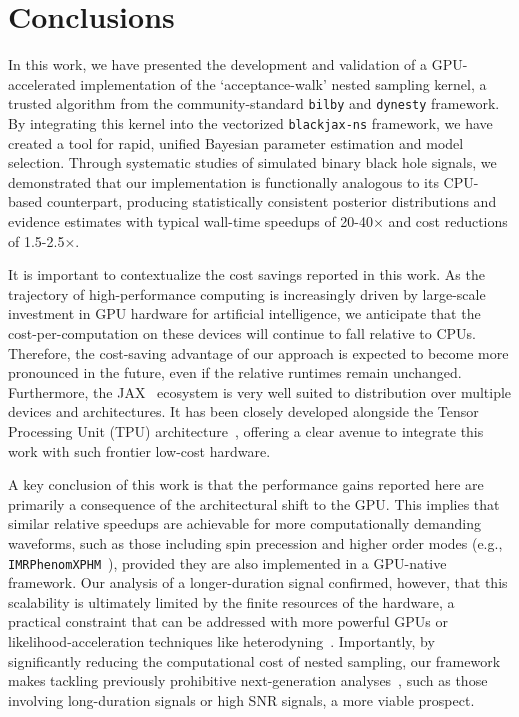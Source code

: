 \documentclass[fleqn,usenatbib]{mnras}
\begin{document}
\section{Conclusions}
\label{sec:conclusions}

In this work, we have presented the development and validation of a
GPU-accelerated implementation of the `acceptance-walk' nested sampling
kernel, a trusted algorithm from the community-standard \texttt{bilby}
and \texttt{dynesty} framework. By integrating this kernel into the
vectorized \texttt{blackjax-ns} framework, we have created a tool for
rapid, unified Bayesian parameter estimation and model selection.
Through systematic studies of simulated binary black hole signals, we
demonstrated that our implementation is functionally analogous to its
CPU-based counterpart, producing statistically consistent posterior
distributions and evidence estimates with typical wall-time speedups of
20-40$\times$ and cost reductions of 1.5-2.5$\times$.

It is important to contextualize the cost savings reported in this
work. As the trajectory of
high-performance computing is increasingly driven by large-scale
investment in GPU hardware for artificial intelligence, we
anticipate that the cost-per-computation on these devices will continue
to fall relative to CPUs. Therefore, the cost-saving advantage of our
approach is expected to become more pronounced in the future, even
if the relative runtimes remain unchanged. 
Furthermore, the JAX~\citep{jax2018github} ecosystem is very well 
suited to distribution over multiple devices and 
architectures. It has been closely developed alongside the 
Tensor Processing Unit (TPU) architecture~\citep{jouppi2023tpu}, 
offering a clear avenue to integrate this work with such 
frontier low-cost hardware.

A key conclusion of this work is that the performance gains 
reported here are primarily a consequence
of the architectural shift to the GPU. This implies that similar relative
speedups are achievable for more computationally demanding waveforms,
such as those including spin precession and higher order modes (e.g., 
\texttt{IMRPhenomXPHM}~\citep{IMRPhenomXPHM}), provided they are also
implemented in a GPU-native framework. Our analysis of a longer-duration
signal confirmed, however, that this scalability is ultimately limited
by the finite resources of the hardware, a practical constraint that can
be addressed with more powerful GPUs or likelihood-acceleration techniques
like heterodyning~\citep{TL_relativebinning,relativebinning2,relativebinning3,relativebinning4}.
Importantly, by significantly reducing the computational cost
of nested sampling, our framework makes tackling previously prohibitive
next-generation analyses~\citep{HuAccelerationReview, makaibaker2025}, 
such as those involving long-duration
signals or high SNR signals, a more viable prospect.
\end{document}
